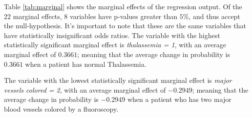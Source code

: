 Table \ref{tab:marginal} shows the marginal effects of the regression output. Of the 22 marginal effects, 8 variables have p-values greater than $5\%$, and thus accept the null-hypothesis. 
It's important to note that these are the same variables that have statistically insignificant odds ratios.
The variable with the highest statistically significant marginal effect is \emph{thalassemia = 1}, with an average marginal effect of $0.3661$; meaning that the average change in probability is $0.3661$ when a patient has normal Thalassemia.

The variable with the lowest statistically significant marginal effect is \emph{major vessels colored = 2}, with an average marginal effect of $-0.2949$; meaning that the average change in probability is $-0.2949$ when a patient who has two major blood vessels colored by a fluoroscopy.

